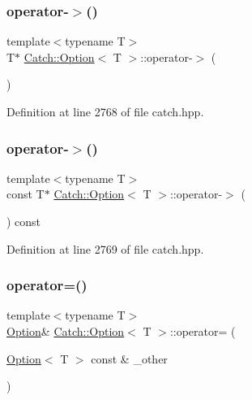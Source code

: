 \subsubsection{\texorpdfstring{operator-\/$>$()}{operator->()}\hspace{0.1cm}{\footnotesize\ttfamily [1/2]}}
{\footnotesize\ttfamily template$<$typename T$>$ \\
T$\ast$ \hyperlink{class_catch_1_1_option}{Catch\+::\+Option}$<$ T $>$\+::operator-\/$>$ (\begin{DoxyParamCaption}{ }\end{DoxyParamCaption})\hspace{0.3cm}{\ttfamily [inline]}}



Definition at line 2768 of file catch.\+hpp.

\hypertarget{class_catch_1_1_option_ae8343cbc36dbb95b2dce333d2a6fdc28}{}\label{class_catch_1_1_option_ae8343cbc36dbb95b2dce333d2a6fdc28} 
\subsubsection{\texorpdfstring{operator-\/$>$()}{operator->()}\hspace{0.1cm}{\footnotesize\ttfamily [2/2]}}
{\footnotesize\ttfamily template$<$typename T$>$ \\
const T$\ast$ \hyperlink{class_catch_1_1_option}{Catch\+::\+Option}$<$ T $>$\+::operator-\/$>$ (\begin{DoxyParamCaption}{ }\end{DoxyParamCaption}) const\hspace{0.3cm}{\ttfamily [inline]}}



Definition at line 2769 of file catch.\+hpp.

\hypertarget{class_catch_1_1_option_a78c65b15dd6b2fbd04c5012c43017c8f}{}\label{class_catch_1_1_option_a78c65b15dd6b2fbd04c5012c43017c8f} 
\subsubsection{\texorpdfstring{operator=()}{operator=()}\hspace{0.1cm}{\footnotesize\ttfamily [1/2]}}
{\footnotesize\ttfamily template$<$typename T$>$ \\
\hyperlink{class_catch_1_1_option}{Option}\& \hyperlink{class_catch_1_1_option}{Catch\+::\+Option}$<$ T $>$\+::operator= (\begin{DoxyParamCaption}\item[{\hyperlink{class_catch_1_1_option}{Option}$<$ T $>$ const \&}]{\+\_\+other }\end{DoxyParamCaption})\hspace{0.3cm}{\ttfamily [inline]}}



